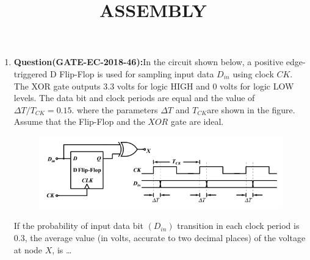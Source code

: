 \documentclass[12pt]{article}
\begin{document}
\title{\textbf{ASSEMBLY}}
\date{}
\maketitle
\begin{enumerate}
   \item  \textbf{Question(GATE-EC-2018-46):}In the circuit shown below, a positive edge-triggered D Flip-Flop is used for sampling input
data $D_{in}$ using clock $CK$. The XOR gate outputs 3.3 volts for logic HIGH and 0 volts for logic LOW levels. The data bit and clock periods are equal and the value of $\Delta{T}/{T_{CK}}=0.15.$
where the parameters $\Delta{T}$ and $ T_{CK}$are shown in the figure. Assume that the Flip-Flop and the
$XOR$ gate are ideal.

 \begin{figure}[!h]
        \centering
        \includegraphics[width=\columnwidth]{figs/2018-gate-ec-46.png}
        \caption{}
        \label{fig:2018-gate-ec-46}
    \end{figure}

   
   If the probability of input data bit $( D_{in} )$ transition in each clock period is $0.3$, the average
value (in volts, accurate to two decimal places) of the voltage at node $X$, is \dots



\end{enumerate}
\end{document}
